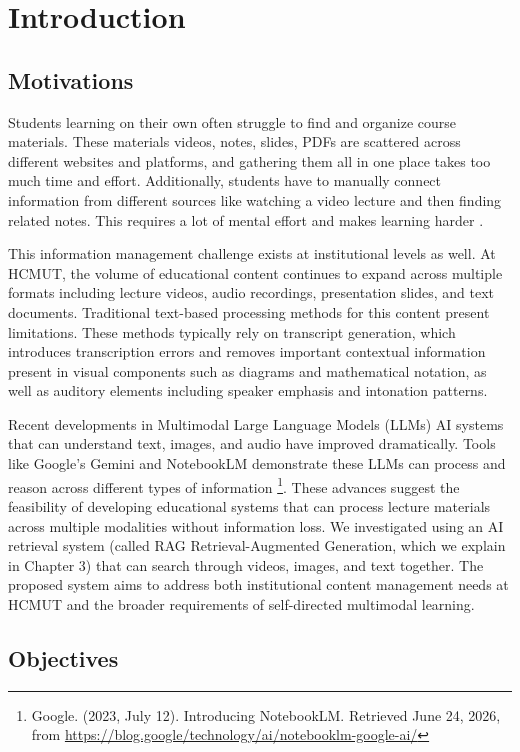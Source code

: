 \chapter{Introduction}

\section{Motivations}

Students learning on their own often struggle to find and organize course materials. These materials videos, notes, slides, PDFs are scattered across different websites and platforms, and gathering them all in one place takes too much time and effort. Additionally, students have to manually connect information from different sources like watching a video lecture and then finding related notes. This requires a lot of mental effort and makes learning harder \cite{bib01, bib02}.

This information management challenge exists at institutional levels as well. At HCMUT, the volume of educational content continues to expand across multiple formats including lecture videos, audio recordings, presentation slides, and text documents. Traditional text-based processing methods for this content present limitations. These methods typically rely on transcript generation, which introduces transcription errors and removes important contextual information present in visual components such as diagrams and mathematical notation, as well as auditory elements including speaker emphasis and intonation patterns.

Recent developments in Multimodal Large Language Models (LLMs) AI systems that can understand text, images, and audio have improved dramatically. Tools like Google's Gemini and NotebookLM demonstrate these LLMs can process and reason across different types of information \footnote{Google. (2023, July 12). Introducing NotebookLM. Retrieved June 24, 2026, from \url{https://blog.google/technology/ai/notebooklm-google-ai/}}. These advances suggest the feasibility of developing educational systems that can process lecture materials across multiple modalities without information loss. We investigated using an AI retrieval system (called RAG Retrieval-Augmented Generation, which we explain in Chapter 3) that can search through videos, images, and text together. The proposed system aims to address both institutional content management needs at HCMUT and the broader requirements of self-directed multimodal learning.\section{Objectives}

